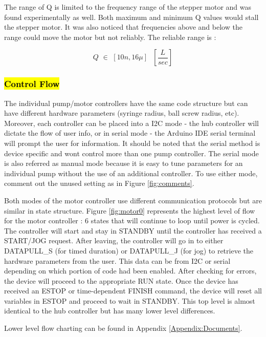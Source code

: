 \documentclass[journal]{IEEEtran}
\begin{document}
                The range of Q is limited to the frequency range of the stepper motor and was found experimentally as well. Both maximum and minimum Q values would stall the stepper motor. It was also noticed that frequencies above and below the range could move the motor but not reliably. The reliable range is : 
                
                \[ Q \,\,\in \,\,[10n, 16\mu] \,\,\,\, \left [\frac{L}{sec} \right ]\]
                
            \subsubsection{\hl{Control Flow}}
                The individual pump/motor controllers have the same code structure but can have different hardware parameters (syringe radius, ball screw radius, etc). Moreover, each controller can be placed into a I2C mode - the hub controller will dictate the flow of user info, or in serial mode - the Arduino IDE serial terminal will prompt the user for information. It should be noted that the serial method is device specific and wont control more than one pump controller. The serial mode is also referred as manual mode because it is easy to tune parameters for an individual pump without the use of an additional controller. To use either mode, comment out the unused setting as in Figure \ref{fig:comments}. 
                
                Both modes of the motor controller use different communication protocols but are similar in state structure. Figure \ref{fig:motor0} represents the highest level of flow for the motor controller : 6 states that will continue to loop until power is cycled. The controller will start and stay in STANDBY until the controller has received a START/JOG request. After leaving, the controller will go in to either DATAPULL\_S (for timed duration) or DATAPULL\_J (for jog) to retrieve the hardware parameters from the user. This data can be from I2C or serial depending on which portion of code had been enabled. After checking for errors, the device will proceed to the appropriate RUN state. Once the device has received an ESTOP or time-dependent FINISH command, the device will reset all variables in ESTOP and proceed to wait in STANDBY. This top level is almost identical to the hub controller but has many lower level differences. 
                
                Lower level flow charting can be found in Appendix \ref{Appendix:Documents}.
                
\end{document}
